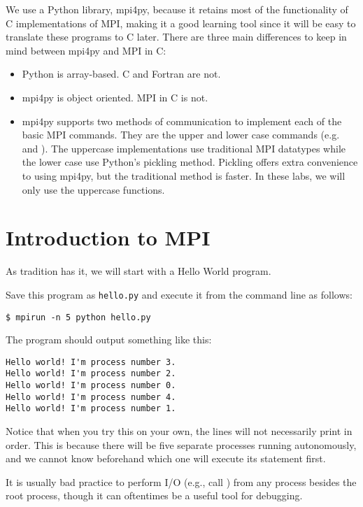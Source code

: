 We use a Python library, mpi4py, because it retains most of the functionality of 
C implementations of MPI, making it a good learning tool since it will be easy to 
translate these programs to C later. 
There are three main differences to keep in mind between mpi4py and MPI in C:
\begin{itemize}
    \item Python is array-based. C and Fortran are not.
    \item mpi4py is object oriented. MPI in C is not.
    \item mpi4py supports two methods of communication to implement each of the basic MPI commands. 
    They are the upper and lower case commands (e.g.  and ). 
    The uppercase implementations use traditional MPI datatypes while the lower case use 
    Python's pickling method. Pickling offers extra convenience to using mpi4py, 
    but the traditional method is faster. In these labs, we will only use the uppercase functions.
\end{itemize}


\section*{Introduction to MPI}
As tradition has it, we will start with a Hello World program.

Save this program as \texttt{hello.py} and execute it from the command line as follows:
\begin{lstlisting}[style=ShellInput]
$ mpirun -n 5 python hello.py
\end{lstlisting}
The program should output something like this:
\begin{lstlisting}[style=ShellOutput]
Hello world! I'm process number 3.
Hello world! I'm process number 2.
Hello world! I'm process number 0.
Hello world! I'm process number 4.
Hello world! I'm process number 1.
\end{lstlisting}
Notice that when you try this on your own, the lines will not necessarily print in order. 
This is because there will be five separate processes running autonomously, and we cannot 
know beforehand which one will execute its  statement first.

\begin{warn}
It is usually bad practice to perform I/O (e.g., call ) from any process 
besides the root process, though it can oftentimes be a useful tool for debugging.
\end{warn}

